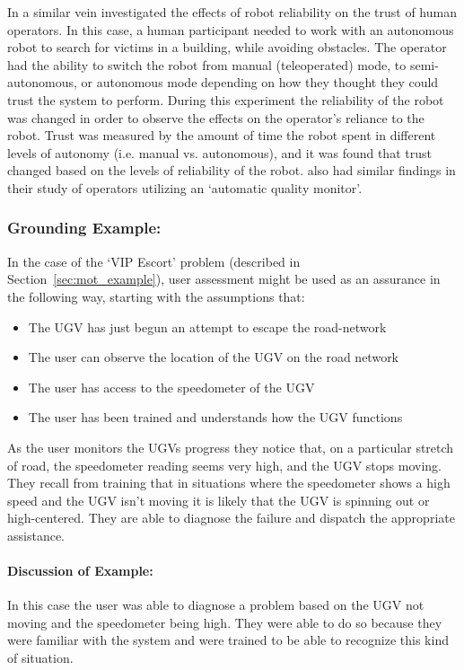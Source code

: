 In a similar vein \citet{Desai2012-rc} investigated the effects of robot reliability on the trust of human operators. In this case, a human participant needed to work with an autonomous robot to search for victims in a building, while avoiding obstacles. The operator had the ability to switch the robot from manual (teleoperated) mode, to semi-autonomous, or autonomous mode depending on how they thought they could trust the system to perform. During this experiment the reliability of the robot was changed in order to observe the effects on the operator's reliance to the robot. Trust was measured by the amount of time the robot spent in different levels of autonomy (i.e. manual vs. autonomous), and it was found that trust changed based on the levels of reliability of the robot. \citet{Yu2018-qw} also had similar findings in their study of operators utilizing an `automatic quality monitor'.

\subsubsection{Grounding Example:}
In the case of the `VIP Escort' problem (described in Section~\ref{sec:mot_example}), user assessment might be used as an assurance in the following way, starting with the assumptions that:

\begin{itemize}
    \item The UGV has just begun an attempt to escape the road-network
    \item The user can observe the location of the UGV on the road network
    \item The user has access to the speedometer of the UGV
    \item The user has been trained and understands how the UGV functions
\end{itemize}

As the user monitors the UGVs progress they notice that, on a particular stretch of road, the speedometer reading seems very high, and the UGV stops moving. They recall from training that in situations where the speedometer shows a high speed and the UGV isn't moving it is likely that the UGV is spinning out or high-centered. They are able to diagnose the failure and dispatch the appropriate assistance.

\paragraph{\textbf{Discussion of Example:}} In this case the user was able to diagnose a problem based on the UGV not moving and the speedometer being high. They were able to do so because they were familiar with the system and were trained to be able to recognize this kind of situation.
